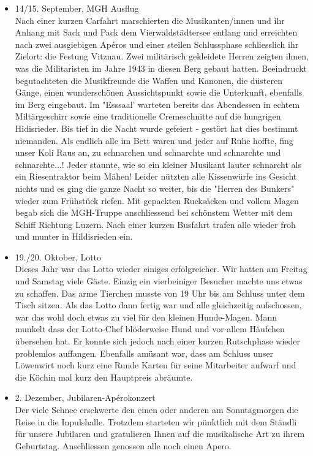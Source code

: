 \begin{history}
\begin{itemize}
        \item[]14/15. September, MGH Ausflug\\
        Nach einer kurzen Carfahrt marschierten die Musikanten/innen und ihr
        Anhang mit Sack und Pack dem Vierwaldstädtersee entlang und erreichten
        nach zwei ausgiebigen Apéros und einer steilen Schlussphase schliesslich
        ihr Zielort: die Festung Vitznau. Zwei militärisch gekleidete Herren
        zeigten ihnen, was die Militaristen im Jahre 1943 in diesen Berg gebaut
        hatten. Beeindruckt begutachteten die Musikfreunde die Waffen und
        Kanonen, die düsteren Gänge, einen wunderschönen Aussichtspunkt sowie
        die Unterkunft, ebenfalls im Berg eingebaut. Im "Esssaal' warteten
        bereits das Abendessen in echtem Miltärgeschirr sowie eine traditionelle
        Cremeschnitte auf die hungrigen Hidisrieder. Bis tief in die Nacht wurde
        gefeiert - gestört hat dies bestimmt niemanden. Als endlich alle im Bett
        waren und jeder auf Ruhe hoffte, fing unser Koli Raus an, zu schnarchen
        und schnarchte und schnarchte und schnarchte...! Jeder staunte, wie so
        ein kleiner Musikant lauter schnarcht als ein Riesentraktor beim Mähen!
        Leider nützten alle Kissenwürfe ins Gesicht nichts und es ging die ganze
        Nacht so weiter, bis die "Herren des Bunkers" wieder zum Frühstück
        riefen. Mit gepackten Rucksäcken und vollem Magen begab sich die
        MGH-Truppe anschliessend bei schönstem Wetter mit dem Schiff Richtung
        Luzern. Nach einer kurzen Busfahrt trafen alle wieder froh und munter in
        Hildisrieden ein.

        \item[]19./20. Oktober, Lotto\\
        Dieses Jahr war das Lotto wieder einiges erfolgreicher. Wir hatten am
        Freitag und Samstag viele Gäste. Einzig ein vierbeiniger Besucher machte
        uns etwas zu schaffen. Das arme Tierchen musste von 19 Uhr bis am
        Schluss unter dem Tisch sitzen. Als das Lotto dann fertig war und alle
        gleichzeitig aufschossen, war das wohl doch etwas zu viel für den
        kleinen Hunde-Magen. Mann munkelt dass der Lotto-Chef blöderweise Hund
        und vor allem Häufchen übersehen hat. Er konnte sich jedoch nach einer
        kurzen Rutschphase wieder problemlos auffangen. Ebenfalls amüsant war,
        dass am Schluss unser Löwenwirt noch kurz eine Runde Karten für seine
        Mitarbeiter aufwarf und die Köchin mal kurz den Hauptpreis abräumte.

        \item[]2. Dezember, Jubilaren-Apérokonzert\\
        Der viele Schnee erschwerte den einen oder anderen am Sonntagmorgen die
        Reise in die Inpulshalle. Trotzdem starteten wir pünktlich mit dem
        Ständli für unsere Jubilaren und gratulieren Ihnen auf die musikalische
        Art zu ihrem Geburtstag. Anschliessen genossen alle noch einen Apero.

    \end{itemize}

\end{history}
